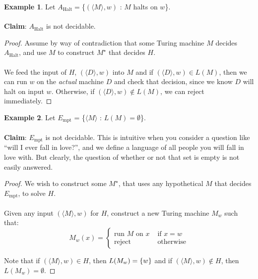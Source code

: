 \documentclass[]{article}
\DeclarePairedDelimiter{\set}{\lbrace}{\rbrace}
\theoremstyle{definition}
\newtheorem{ex}{Example}[section]
\begin{document}
      \begin{ex}
        Let $A_\text{Halt} = $\{$(\langle M \rangle, w)$ : $M$ halts on $w$\}.
        \\ \\
        \textbf{Claim}: $A_\text{Halt}$ is not decidable.

        \begin{proof}
          Assume by way of contradiction that some Turing machine $M$ decides $A_\text{Halt}$, and use $M$ to construct $M^\star$ that decides $H$.
          \\ \\
          We feed the input of $H$, $(\langle D \rangle, w)$ into $M$ and if $(\langle D \rangle, w) \in L(M)$, then we can run $w$ on the \emph{actual} machine $D$ and check that decision, since we know $D$ will halt on input $w$. Otherwise, if  $(\langle D \rangle, w) \not \in L(M)$, we can reject immediately.
        \end{proof}
      \end{ex}

      \begin{ex}
        Let $E_\text{mpt}$ = \{$\langle M \rangle$ : $L(M) = \emptyset$\}.
        \\ \\
        \textbf{Claim}: $E_\text{mpt}$ is not decidable. This is intuitive when you consider a question like ``will I ever fall in love?'', and we define a language of all people you will fall in love with. But clearly, the question of whether or not that set is empty is not easily answered.

        \begin{proof}
          We wish to construct some $M^\star$, that uses any hypothetical $M$ that decides $E_\text{mpt}$, to solve $H$.
          \\ \\
          Given any input $(\langle M \rangle, w)$ for $H$, construct a new Turing machine $M_w$ such that:
          $$
            M_w(x) = \begin{cases}
              \text{run } M \text{ on } x & \text{ if } x = w \\
              \text{reject} & \text{ otherwise}
            \end{cases}
          $$

          Note that if $(\langle M \rangle, w) \in H$, then $L(M_w) = \set{w}$ and if $(\langle M \rangle, w) \not \in H$, then $L(M_w) = \emptyset$.
        \end{proof}
      \end{ex}
\end{document}

